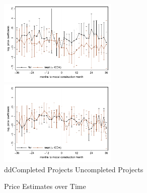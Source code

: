\documentclass[aspectratio=149]{beamer}
\begin{document}
\begin{frame}
\begin{figure}
\caption{Price Estimates over Time}\label{figure:timeplot}
\includegraphics[width=0.5\textwidth,trim={.77cm 0cm .21cm 0cm}]{timeplot.pdf}
   \hfill
\includegraphics[width=0.5\textwidth,trim={.77cm 0cm .21cm 0cm},clip]{timeplot_placebo.pdf}\\
{\color{white}dd}Completed Projects \hspace{4.2cm} Uncompleted Projects
\end{figure}
\end{frame}


%
\end{document}
